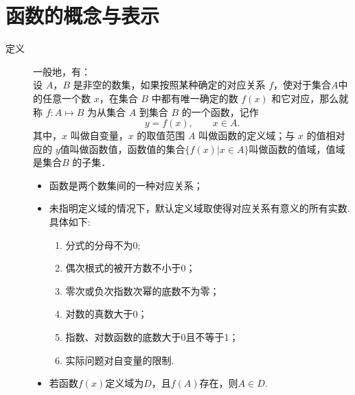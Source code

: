 \section{函数的概念与表示}
  \begin{description}
    \item [定义] 一般地，有：\\
      设 $A$，$B$ 是非空的数集，如果按照某种确定的对应关系 $f$，使对于集合$A$中的任意一个数 $x$，在集合 $B$ 中都有唯一确定的数 $f(x)$ 和它对应，那么就称 $f\colon A\mapsto B$ 为从集合 $A$ 到集合 $B$ 的一个函数，记作
      $$y=f(x),\qquad x\in A.$$
      其中，$x$ 叫做自变量，$x$ 的取值范围 $A$ 叫做函数的定义域；与 $x$ 的值相对应的 $y $值叫做函数值，函数值的集合$\{f(x)|x\in A\}$叫做函数的值域，值域是集合$B$ 的子集．
      \begin{itemize}[leftmargin=*]
        \kaishu
        \item 函数是两个数集间的一种对应关系；
        \item 未指明定义域的情况下，默认定义域取使得对应关系有意义的所有实数. 具体如下:
        \begin{enumerate}[label=\circled{\arabic*}]
          \item 分式的分母不为0;
          \item 偶次根式的被开方数不小于0；
          \item 零次或负次指数次幂的底数不为零；
          \item 对数的真数大于0；
          \item 指数、对数函数的底数大于0且不等于1；
          \item 实际问题对自变量的限制.
        \end{enumerate}
        \item 若函数$f(x)$定义域为$D$，且$f(A)$存在，则$A\in D.$
      \end{itemize}
  \end{description}
  \clearpage
